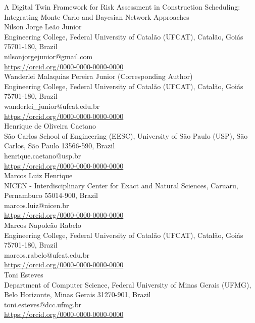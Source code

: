 \documentclass[12pt,a4paper]{article}
\date{}  %
\begin{document}


\begin{center}
{\Huge A Digital Twin Framework for Risk Assessment in Construction Scheduling: Integrating Monte Carlo and Bayesian Network Approaches}
\\[4ex]

\noindent
{\large Nilson Jorge Leão Junior} \\
{\small
Engineering College, Federal University of Catalão (UFCAT), Catalão, Goiás 75701-180, Brazil \\
nilsonjorgejunior@gmail.com \\
\url{https://orcid.org/0000-0000-0000-0000}
} \\[1.2em]

{\large Wanderlei Malaquias Pereira Junior \small(Corresponding Author)} \\
{\small
Engineering College, Federal University of Catalão (UFCAT), Catalão, Goiás 75701-180, Brazil \\
wanderlei\_junior@ufcat.edu.br \\
\url{https://orcid.org/0000-0000-0000-0000}
} \\[1.2em]

{\large Henrique de Oliveira Caetano} \\
{\small
São Carlos School of Engineering (EESC), University of São Paulo (USP), São Carlos, São Paulo 13566-590, Brazil \\
henrique.caetano@usp.br \\
\url{https://orcid.org/0000-0000-0000-0000}
} \\[1.2em]

{\large Marcos Luiz Henrique} \\
{\small
NICEN - Interdisciplinary Center for Exact and Natural Sciences, Caruaru, Pernambuco 55014-900, Brazil \\
marcos.luiz@nicen.br \\
\url{https://orcid.org/0000-0000-0000-0000}
} \\[1.2em]

{\large Marcos Napoleão Rabelo} \\
{\small
Engineering College, Federal University of Catalão (UFCAT), Catalão, Goiás 75701-180, Brazil \\
marcos.rabelo@ufcat.edu.br \\
\url{https://orcid.org/0000-0000-0000-0000}
} \\[1.2em]

{\large Toni Esteves} \\
{\small
Department of Computer Science, Federal University of Minas Gerais (UFMG), Belo Horizonte, Minas Gerais 31270-901, Brazil \\
toni.esteves@dcc.ufmg.br \\
\url{https://orcid.org/0000-0000-0000-0000}
} \\[1.2em]


\end{center}
\end{document}
